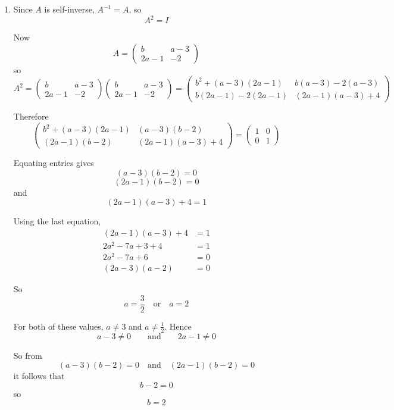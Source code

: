 \documentclass[leqno]{article}
\begin{document}
\begin{enumerate}[
  label=\textbf{\arabic*.},
  leftmargin=*,
  topsep=0pt,
  partopsep=0pt,
  parsep=0pt
]
\vspace*{30pt}

\begin{tcolorbox}[colback=white, colframe=scarlet, title={\textbf{Solution}}, breakable, grow to left by=6mm, grow to right by=10mm]
\begin{enumerate}[label=\textbf{(\alph*)}]
  \item Since \(A\) is self-inverse, \(A^{-1}=A\), so
\[
A^2=I
\]

Now
\[
A=\begin{pmatrix} b & a-3 \\ 2a-1 & -2 \end{pmatrix}
\]
so
\[
A^2=
\begin{pmatrix} b & a-3 \\ 2a-1 & -2 \end{pmatrix}
\begin{pmatrix} b & a-3 \\ 2a-1 & -2 \end{pmatrix}
=
\begin{pmatrix}
b^2+(a-3)(2a-1) & b(a-3)-2(a-3) \\
b(2a-1)-2(2a-1) & (2a-1)(a-3)+4
\end{pmatrix}
\]

Therefore
\[
\begin{pmatrix}
b^2+(a-3)(2a-1) & (a-3)(b-2) \\
(2a-1)(b-2) & (2a-1)(a-3)+4
\end{pmatrix}
=
\begin{pmatrix}
1 & 0 \\
0 & 1
\end{pmatrix}
\]

Equating entries gives
\[
(a-3)(b-2)=0
\]
\[
(2a-1)(b-2)=0
\]
and
\[
(2a-1)(a-3)+4=1
\]

Using the last equation,
\begin{align*}
(2a-1)(a-3)+4&=1\\
2a^2-7a+3+4&=1\\
2a^2-7a+6&=0\\
(2a-3)(a-2)&=0
\end{align*}

So
\[
a=\frac32 \quad \text{or} \quad a=2
\]

For both of these values, \(a\neq 3\) and \(a\neq \frac12\). Hence
\[
a-3\neq 0 \qquad \text{and} \qquad 2a-1\neq 0
\]

So from
\[
(a-3)(b-2)=0 \quad \text{and} \quad (2a-1)(b-2)=0
\]
it follows that
\[
b-2=0
\]
so
\[
b=2
\]


\end{enumerate}
\end{tcolorbox}
\end{enumerate}
\end{document}
